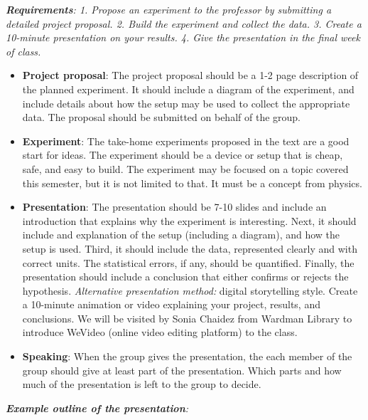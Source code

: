 \documentclass[10pt]{article}
\begin{document}
\maketitle

\noindent
\textit{\textbf{Requirements}: 1. Propose an experiment to the professor by submitting a detailed project proposal.  2. Build the experiment and collect the data.  3. Create a 10-minute presentation on your results.  4. Give the presentation in the final week of class.} \\
\begin{itemize}
\item\textbf{ Project proposal}: The project proposal should be a 1-2 page description of the planned experiment.  It should include a diagram of the experiment, and include details about how the setup may be used to collect the appropriate data.  The proposal should be submitted on behalf of the group.
\item \textbf{Experiment}: The take-home experiments proposed in the text are a good start for ideas.  The experiment should be a device or setup that is cheap, safe, and easy to build.  The experiment may be focused on a topic covered this semester, but it is not limited to that.  It must be a concept from physics.
\item \textbf{Presentation}: The presentation should be 7-10 slides and include an introduction that explains why the experiment is interesting.  Next, it should include and explanation of the setup (including a diagram), and how the setup is used.  Third, it should include the data, represented clearly and with correct units.  The statistical errors, if any, should be quantified.  Finally, the presentation should include a conclusion that either confirms or rejects the hypothesis.  \textit{Alternative presentation method:} digital storytelling style.  Create a 10-minute animation or video explaining your project, results, and conclusions.  We will be visited by Sonia Chaidez from Wardman Library to introduce WeVideo (online video editing platform) to the class.
\item \textbf{Speaking}: When the group gives the presentation, the each member of the group should give at least part of the presentation.  Which parts and how much of the presentation is left to the group to decide.
\end{itemize}
\textit{\textbf{Example outline of the presentation}:}
\end{document}
